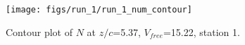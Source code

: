 \begin{figure}[H]
\centering
\texttt{[image: figs/run\_1/run\_1\_num\_contour]}
\caption{Contour plot of $N$ at $z/c$=5.37, $V_{free}$=15.22, station 1.}
\label{fig:run_1_num_contour}
\end{figure}


